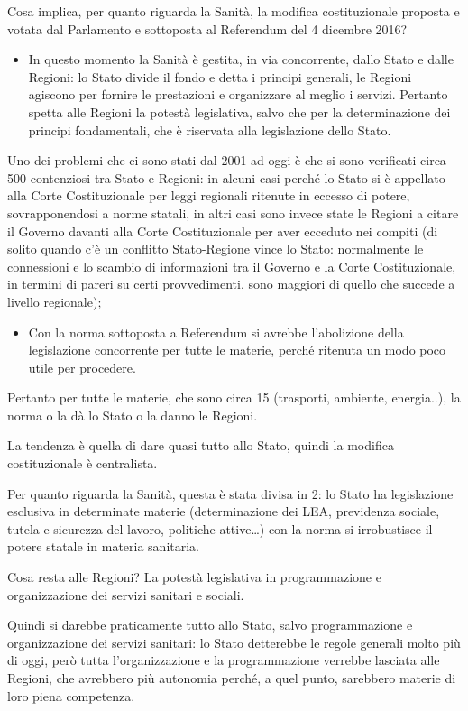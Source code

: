 Cosa implica, per quanto riguarda la Sanità, la modifica costituzionale proposta e votata dal Parlamento e sottoposta al Referendum del 4 dicembre 2016?

\begin{itemize}
\item
  In questo momento la Sanità è gestita, in via concorrente, dallo Stato
  e dalle Regioni: lo Stato divide il fondo e detta i principi generali,
  le Regioni agiscono per fornire le prestazioni e organizzare al meglio
  i servizi. Pertanto spetta alle Regioni la potestà legislativa, salvo
  che per la determinazione dei principi fondamentali, che è riservata
  alla legislazione dello Stato.
\end{itemize}

Uno dei problemi che ci sono stati dal 2001 ad oggi è che si sono verificati circa 500 contenziosi tra Stato e Regioni: in alcuni casi perché lo Stato si è appellato alla Corte Costituzionale per leggi regionali ritenute in eccesso di potere, sovrapponendosi a norme statali, in altri casi sono invece state le Regioni a citare il Governo davanti alla Corte Costituzionale per aver ecceduto nei compiti (di solito quando c'è un conflitto Stato-Regione vince lo Stato: normalmente le connessioni e lo scambio di informazioni tra il Governo e la Corte Costituzionale, in termini di pareri su certi provvedimenti, sono maggiori di quello che succede a livello regionale);

\begin{itemize}
\item
  Con la norma sottoposta a Referendum si avrebbe l'abolizione della legislazione concorrente per tutte le materie, perché ritenuta un modo poco utile per procedere.
\end{itemize}

Pertanto per tutte le materie, che sono circa 15 (trasporti, ambiente, energia..), la norma o la dà lo Stato o la danno le Regioni.

La tendenza è quella di dare quasi tutto allo Stato, quindi la modifica costituzionale è centralista.

Per quanto riguarda la Sanità, questa è stata divisa in 2: lo Stato ha legislazione esclusiva in determinate materie (determinazione dei LEA, previdenza sociale, tutela e sicurezza del lavoro, politiche attive\ldots{}) con la norma si irrobustisce il potere statale in materia sanitaria.

Cosa resta alle Regioni? La potestà legislativa in programmazione e organizzazione dei servizi sanitari e sociali.

Quindi si darebbe praticamente tutto allo Stato, salvo programmazione e organizzazione dei servizi sanitari: lo Stato detterebbe le regole generali molto più di oggi, però tutta l'organizzazione e la programmazione verrebbe lasciata alle Regioni, che avrebbero più autonomia perché, a quel punto, sarebbero materie di loro piena competenza.
